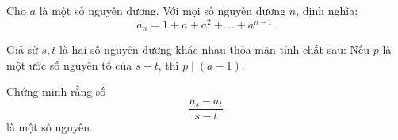 \ifshowproblem
\begin{problem}\label{example:BMO-2015-P3}
    Cho \( a \) là một số nguyên dương. Với mọi số nguyên dương \( n \), định nghĩa:
    \[
        a_n = 1 + a + a^2 + \ldots + a^{n-1}.
    \]

    Giả sử \( s, t \) là hai số nguyên dương khác nhau thỏa mãn tính chất sau:  
    Nếu \( p \) là một ước số nguyên tố của \( s - t \), thì \( p \mid (a - 1) \).

    Chứng minh rằng số
    \[
        \frac{a_s - a_t}{s - t}
    \]
    là một số nguyên.
\end{problem}
\fi

\footnotemark
{}
\fi